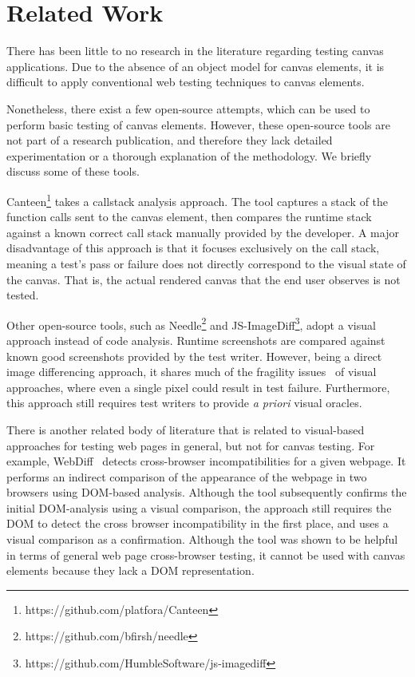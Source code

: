 \section{Related Work}\label{sec:relatedwork}

There has been little to no research in the literature regarding testing canvas applications. Due to the absence of an object model for canvas elements, it is difficult to apply conventional web testing techniques to canvas elements.

Nonetheless, there exist a few open-source attempts, which can be used to perform  basic testing of canvas elements. However, these open-source tools are not part of a research publication, and therefore they lack detailed experimentation or a thorough explanation of the methodology. We briefly discuss some of these tools. 

Canteen\footnote{https://github.com/platfora/Canteen} takes a callstack analysis approach. The tool captures a stack of the function calls sent to the canvas element, then compares the runtime stack against a known correct call stack manually provided by the developer. A major disadvantage of this approach is that it focuses exclusively on the call stack, meaning a test's pass or failure does not directly correspond to the visual state of the canvas. That is, the actual rendered canvas that the end user observes is not tested.

Other open-source tools, such as Needle\footnote{https://github.com/bfirsh/needle} and JS-ImageDiff\footnote{https://github.com/HumbleSoftware/js-imagediff}, adopt a visual approach instead of code analysis. Runtime screenshots are compared against known good screenshots provided by the test writer. However, being a direct image differencing approach, it shares much of the fragility issues~\cite{coppola_automated_2016, leotta_visual_2014} of visual approaches, where even a single pixel could result in test failure. Furthermore, this approach still requires test writers to provide \textit{a priori} visual oracles.

There is another related body of literature that is related to visual-based approaches for testing web pages in general, but not for canvas testing. For example, WebDiff~\cite{choudhary2010webdiff} detects cross-browser incompatibilities for a given webpage. It performs an indirect comparison of the appearance of the webpage in two browsers using DOM-based analysis. Although the tool subsequently confirms the initial DOM-analysis using a visual comparison, the approach still requires the DOM to detect the cross browser incompatibility in the first place, and uses a visual comparison as a confirmation. Although the tool was shown to be helpful in terms of general web page cross-browser testing, it cannot be used with canvas elements because they lack a DOM representation. 

